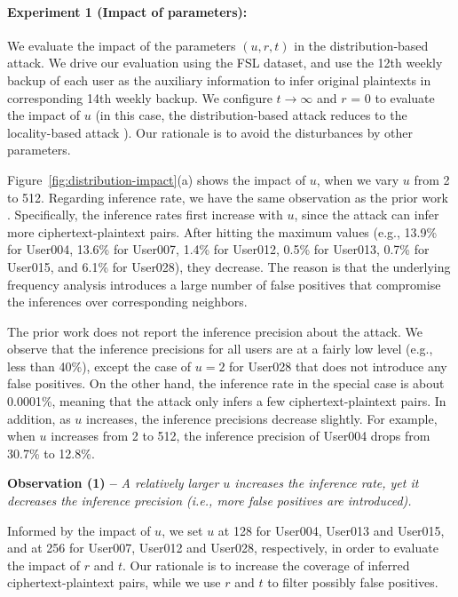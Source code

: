 \documentclass[bachelor]{thesis-uestc}
\begin{document}
\paragraph{Experiment 1 (Impact of parameters):}
We evaluate the impact of the parameters $(u, r, t)$ in the distribution-based
attack. We drive our evaluation using the FSL dataset, and use the 12th weekly
backup of each user as the auxiliary information to infer original plaintexts
in corresponding 14th weekly backup.  We configure $t \rightarrow \infty$ and $r$ = 0 to
evaluate the impact of $u$ (in this case, the distribution-based attack
reduces to the locality-based attack \cite{li17}). Our rationale is to avoid
the disturbances by other parameters. 

Figure~\ref{fig:distribution-impact}(a) shows the impact of $u$,
when we vary $u$ from 2 to 512. Regarding inference rate, we have the same
observation as the prior work \cite{li17}. Specifically, the inference rates
first increase with $u$, since the attack can infer more ciphertext-plaintext
pairs. After hitting the maximum values (e.g., 13.9\% for User004, 13.6\% for
User007, 1.4\% for User012, 0.5\% for User013, 0.7\% for User015, and 6.1\%
for User028), they decrease.  The reason is that the underlying frequency
analysis introduces a large number of false positives that compromise the
inferences over corresponding neighbors.    

The prior work \cite{li17} does not report the inference precision about the
attack. We observe that the inference precisions for all users are at a
fairly low level (e.g., less than 40\%), except the case of $u = 2$ for
User028 that does not introduce any false positives. On the other hand, the
inference rate in the special case is about 0.0001\%, meaning that the attack
only infers a few ciphertext-plaintext pairs. In addition, as $u$ increases,
the inference precisions decrease slightly. For example, when $u$ increases
from 2 to 512, the inference precision of User004 drops from 30.7\% to 12.8\%.      

{\bf Observation (1) --} {\em A relatively larger $u$ increases the inference
rate, yet it decreases the inference precision (i.e., more false positives are
introduced). }

Informed by the impact of $u$, we set $u$ at 128 for User004, User013 and
User015, and at 256 for User007, User012 and User028, respectively, in order
to evaluate the impact of $r$ and $t$. 
Our rationale is to increase the coverage of inferred ciphertext-plaintext
pairs, while we use $r$ and $t$ to filter possibly false positives. 
\end{document}
